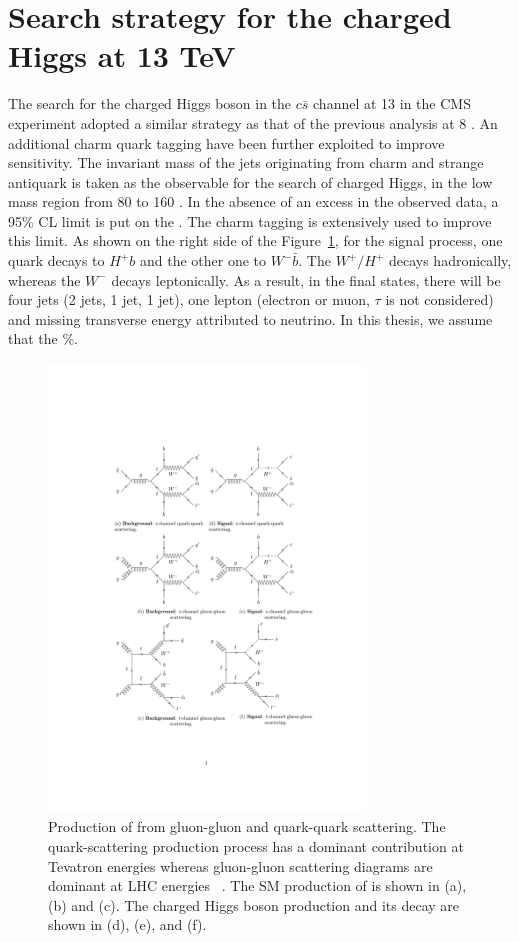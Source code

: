  
\section{Search strategy for the charged Higgs at 13 TeV}
\label{s:searchStrategy}

The search for the charged Higgs boson in the $c\bar{s}$ channel at 13 \TeV 
in the CMS experiment adopted a similar strategy as that of the previous analysis
at 8 \TeV \cite{Khachatryan:2015uua}. An additional charm quark tagging have been
further exploited to improve sensitivity. The invariant mass of the jets originating from 
charm and strange antiquark is taken as the observable for the search of charged Higgs, in the 
low mass region from 80 to 160 \GeV. In the absence of an excess in the observed data,
a 95\% CL limit is put on the \brThb. The charm tagging is extensively used to
improve this limit. As shown on the right side of the Figure~\ref{fig:feyn_diag_sig}, 
for the signal process, one \PQt quark decays to $H^+ b$ and the other one to 
$W^- \bar{b}$. The $W^+/H^+$ decays hadronically, whereas the $W^-$ decays 
leptonically. As a result, in the final states, there will be four jets (2 \PQb jets, 
1 \PQc jet, 1 \PQs jet), one lepton (electron or muon, $\tau$ is not considered) 
and missing transverse energy attributed to neutrino. In this thesis, we assume that the \%.
\begin{figure}
\centering
\includegraphics[width=0.75\textwidth]{Image/FeynDiag/feyn_diag_sig.pdf}
\caption{Production of \ttbar from gluon-gluon and quark-quark scattering. 
         The quark-scattering production process has a dominant contribution at 
         Tevatron energies whereas gluon-gluon scattering diagrams are dominant 
         at LHC energies ~\cite{Gerber:2014xea, Fiorini:2012fe}. The SM production
         of \ttbar is shown in (a), (b) and (c). The charged Higgs boson 
         production and its decay are shown in (d), (e), and (f).}
\label{fig:feyn_diag_sig}
\end{figure}

